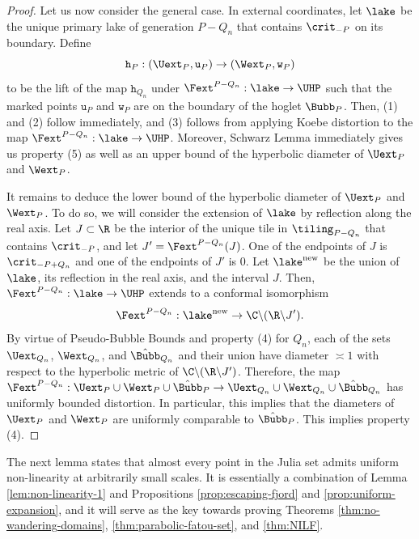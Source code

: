 \documentclass{amsart}
\begin{document}
\begin{proof}
    Let us now consider the general case. 
    In external coordinates, let $\lake$ be the unique primary lake of generation $P-Q_n$ that contains $\crit_{-P}$ on its boundary.
    Define 
    \[
        \mathtt{h}_P: (\Uext_P, \mathtt{u}_P) \to (\Wext_P, \mathtt{w}_P)
    \]
    to be the lift of the map $\mathtt{h}_{Q_n}$ under $\Fext^{P-Q_n}: \lake \to \UHP$ such that the marked points $\mathtt{u}_P$ and $\mathtt{w}_P$ are on the boundary of the hoglet $\Bubb_{P}$.
    Then, (1) and (2) follow immediately, and (3) follows from applying Koebe distortion to the map $\Fext^{P-Q_n}: \lake \to \UHP$. 
    Moreover, Schwarz Lemma immediately gives us property (5) as well as an upper bound of the hyperbolic diameter of $\Uext_P$ and $\Wext_P$.
    
    It remains to deduce the lower bound of the hyperbolic diameter of $\Uext_P$ and $\Wext_P$. 
    To do so, we will consider the extension of $\lake$ by reflection along the real axis. 
    Let $J \subset \R$ be the interior of the unique tile in $\tiling_{P-Q_n}$ that contains $\crit_{-P}$, and let $J' = \Fext^{P-Q_n}(J)$.
    One of the endpoints of $J$ is $\crit_{-P+Q_n}$ and one of the endpoints of $J'$ is $0$.
    Let $\lake^{\textnormal{new}}$ be the union of $\lake$, its reflection in the real axis, and the interval $J$.
    Then, $\Fext^{P-Q_n}: \lake \to \UHP$ extends to a conformal isomorphism 
    \[
        \Fext^{P-Q_n} : \lake^{\textnormal{new}} \to \C \backslash (\R \backslash J').
    \]
    By virtue of Pseudo-Bubble Bounds and property (4) for $Q_n$, each of the sets $\Uext_{Q_n}$, $\Wext_{Q_n}$, and $\hat{\Bubb}_{Q_n}$ and their union have diameter $\asymp 1$ with respect to the hyperbolic metric of $\C \backslash (\R \backslash J')$.
    Therefore, the map $\Fext^{P-Q_n}: \Uext_P \cup \Wext_P \cup \hat{\Bubb}_P \to \Uext_{Q_n} \cup \Wext_{Q_n} \cup \hat{\Bubb}_{Q_n}$ has uniformly bounded distortion.
    In particular, this implies that the diameters of $\Uext_P$ and $\Wext_P$ are uniformly comparable to $\hat{\Bubb}_{P}$.
    This implies property (4).
\end{proof}

The next lemma states that almost every point in the Julia set admits uniform non-linearity at arbitrarily small scales.
It is essentially a combination of Lemma \ref{lem:non-linearity-1} and Propositions \ref{prop:escaping-fjord} and \ref{prop:uniform-expansion}, and it will serve as the key towards proving Theorems \ref{thm:no-wandering-domains}, \ref{thm:parabolic-fatou-set}, and \ref{thm:NILF}.
\end{document}
